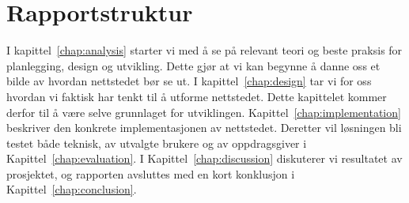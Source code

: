 \section{Rapportstruktur}

I kapittel~\ref{chap:analysis} starter vi med å se på relevant teori og beste praksis for planlegging, design og utvikling. Dette gjør at vi kan begynne å danne oss et bilde av hvordan nettstedet bør se ut. I kapittel~\ref{chap:design} tar vi for oss hvordan vi faktisk har tenkt til å utforme nettstedet. Dette kapittelet kommer derfor til å være selve grunnlaget for utviklingen. Kapittel~\ref{chap:implementation} beskriver den konkrete implementasjonen av nettstedet. Deretter vil løsningen bli testet både teknisk, av utvalgte brukere og av oppdragsgiver i Kapittel~\ref{chap:evaluation}. I Kapittel~\ref{chap:discussion} diskuterer vi resultatet av prosjektet, og rapporten avsluttes med en kort konklusjon i Kapittel~\ref{chap:conclusion}.
